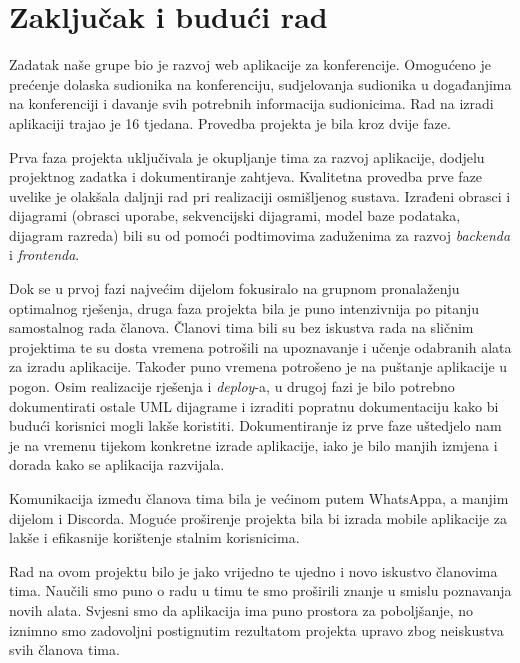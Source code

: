 \chapter{Zaključak i budući rad}
				
		     Zadatak naše grupe bio je razvoj web aplikacije za konferencije. Omogućeno je prećenje dolaska sudionika na konferenciju, sudjelovanja sudionika u događanjima na konferenciji i davanje svih potrebnih informacija sudionicima. Rad na izradi aplikaciji trajao je 16 tjedana. Provedba projekta je bila kroz dvije faze.
   
             Prva faza projekta uključivala je okupljanje tima za razvoj aplikacije, dodjelu projektnog zadatka i dokumentiranje zahtjeva. Kvalitetna provedba prve faze uvelike je olakšala daljnji rad pri realizaciji osmišljenog sustava. Izrađeni obrasci i dijagrami (obrasci uporabe, sekvencijski dijagrami, model baze podataka, dijagram razreda) bili su od pomoći podtimovima zaduženima za razvoj \textit{backenda} i \textit{frontenda}. 
		
		     Dok se u prvoj fazi najvećim dijelom fokusiralo na grupnom pronalaženju optimalnog rješenja, druga faza projekta bila je puno intenzivnija po pitanju samostalnog rada članova. Članovi tima bili su bez iskustva rada na sličnim projektima te su dosta vremena potrošili na upoznavanje i učenje odabranih alata za izradu aplikacije. Također puno vremena potrošeno je na puštanje aplikacije u pogon. Osim realizacije rješenja i \textit{deploy}-a, u drugoj fazi je bilo potrebno dokumentirati ostale UML dijagrame i izraditi popratnu dokumentaciju kako bi budući korisnici mogli lakše koristiti. Dokumentiranje iz prve faze uštedjelo nam je na vremenu tijekom konkretne izrade aplikacije, iako je bilo manjih izmjena i dorada kako se aplikacija razvijala.

             Komunikacija između članova tima bila je većinom putem WhatsAppa, a manjim dijelom i Discorda. Moguće proširenje projekta bila bi izrada mobile aplikacije za lakše i efikasnije korištenje stalnim korisnicima.

             Rad na ovom projektu bilo je jako vrijedno te ujedno i novo iskustvo članovima tima. Naučili smo puno o radu u timu te smo proširili znanje u smislu poznavanja novih alata. Svjesni smo da aplikacija ima puno prostora za poboljšanje, no iznimno smo zadovoljni postignutim rezultatom projekta upravo zbog neiskustva svih članova tima.
		
		\eject 